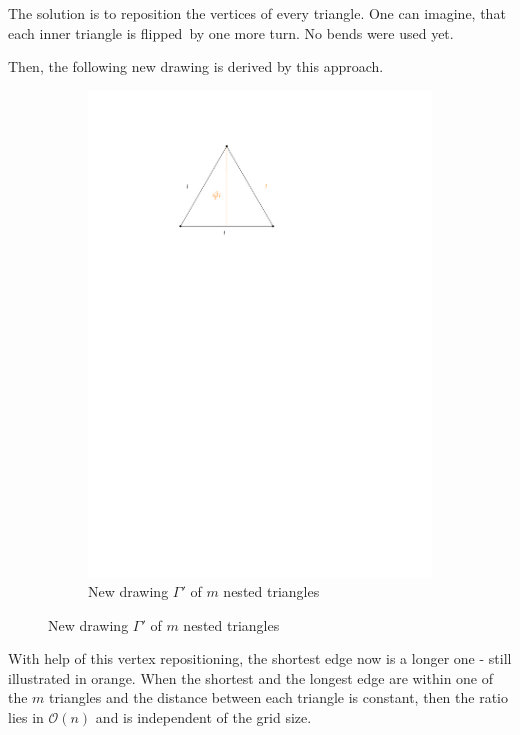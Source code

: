 \begin{observation}The solution is to reposition the vertices of every triangle. One can imagine, that each inner triangle is \grqq flipped\grqq~by one more turn. No bends were used yet.
\end{observation}
Then, the following new drawing is derived by this approach. 
\begin{figure}[H]
	\centering
	\begin{subfigure}{0.8\textwidth}
		\centering
		\includegraphics[page=5]{drawings/previous-results.pdf}
		\caption*{New drawing $\Gamma'$ of $m$ nested triangles}
	\end{subfigure}
\end{figure}
With help of this vertex repositioning, the shortest edge now is a longer one - still illustrated in orange. When the shortest and the longest edge are within one of the $m$ triangles and the distance between each triangle is constant, then the ratio lies in $\mathcal{O}(n)$ and is independent of the grid size.
